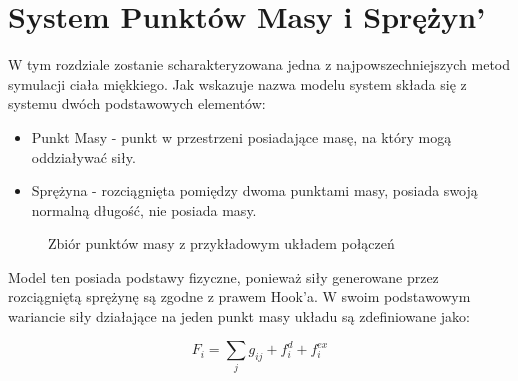 \section{System Punktów Masy i Sprężyn'}
W tym rozdziale zostanie scharakteryzowana jedna z najpowszechniejszych metod symulacji ciała miękkiego. Jak wskazuje nazwa modelu system składa się z systemu  dwóch podstawowych elementów:
\begin{itemize}
\item  Punkt Masy - punkt w przestrzeni posiadające masę, na który mogą oddziaływać siły.
\item Sprężyna - rozciągnięta pomiędzy dwoma punktami masy, posiada swoją normalną długość, nie posiada masy.

\end{itemize} 

\begin{figure}[ht]
\centering

\caption{Zbiór punktów masy z przykładowym układem połączeń}
\end{figure}
Model ten posiada podstawy fizyczne, ponieważ siły generowane przez rozciągniętą sprężynę są zgodne z prawem Hook'a. W swoim podstawowym wariancie siły działające na jeden punkt masy układu są zdefiniowane jako:

%
%
\begin{equation}
F_{i} = \sum_{j} g_{ij} + f^{d}_i + f^{ex}_{i}
\end{equation}

